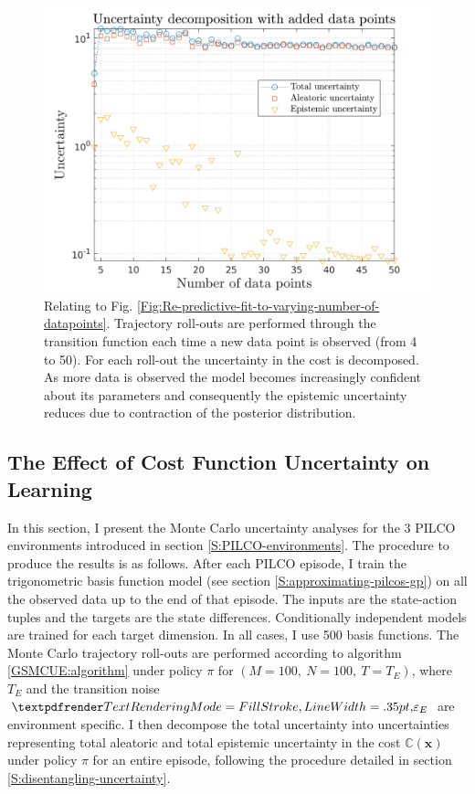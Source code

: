 \begin{figure}[htbp]
\centering    
\includegraphics[width=1\textwidth]{Chapter3/Figures/func_uncertainty_4.png}
\caption[Uncertainty decomposition showing reduction in epistemic uncertainty with increasing number of data points]{Relating to Fig. \ref{Fig:Re-predictive-fit-to-varying-number-of-datapoints}. Trajectory roll-outs are performed through the transition function each time a new data point is observed (from 4 to 50). For each roll-out the uncertainty in the cost is decomposed. As more data is observed the model becomes increasingly confident about its parameters and consequently the epistemic uncertainty reduces due to contraction of the posterior distribution.}
\label{Fig:Re-reduction-in-epsitemic-with-more-data}
\end{figure}


\subsection{The Effect of Cost Function Uncertainty on Learning}
\label{S:Re-PILCO-envs}
In this section, I present the Monte Carlo uncertainty analyses for the 3 PILCO environments introduced in section \ref{S:PILCO-environments}. The procedure to produce the results is as follows. After each PILCO episode, I train the trigonometric basis function model (see section \ref{S:approximating-pilcos-gp}) on all the observed data up to the end of that episode. The inputs are the state-action tuples and the targets are the state differences. Conditionally independent models are trained for each target dimension. In all cases, I use 500 basis functions. The Monte Carlo trajectory roll-outs are performed according to algorithm \ref{GSMCUE:algorithm} under policy $\pi$ for $(M=100,\:N=100,\:T=T_{E})$, where $T_{E}$ and the transition noise $\boldgreek{\varepsilon}_{E}$ are environment specific. I then decompose the total uncertainty into uncertainties representing total aleatoric and total epistemic uncertainty in the cost $\mathbb{C}(\mathbf{x})$ under policy $\pi$ for an entire episode, following the procedure detailed in section \ref{S:disentangling-uncertainty}.


